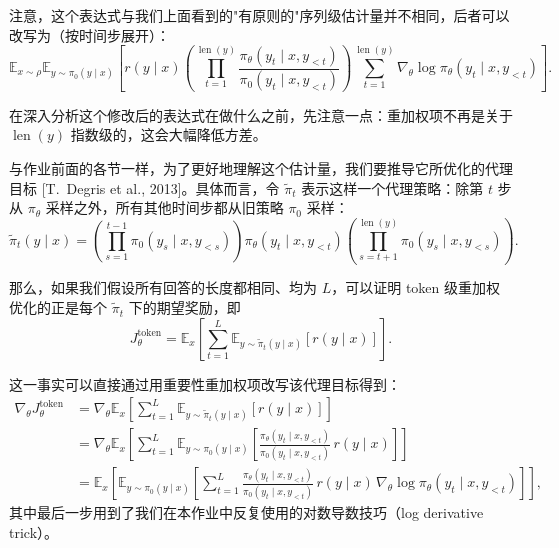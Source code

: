 注意，这个表达式与我们上面看到的"有原则的"序列级估计量并不相同，后者可以改写为（按时间步展开）：
\begin{equation}
\mathbb{E}_{x\sim\rho}\mathbb{E}_{y\sim\pi_0(y \mid x)}\!\left[r(y \mid x)\left(\prod_{t=1}^{\operatorname{len}(y)} \frac{\pi_\theta(y_t \mid x, y_{<t})}{\pi_0(y_t \mid x, y_{<t})}\right)\sum_{t=1}^{\operatorname{len}(y)} \nabla_\theta \log \pi_\theta(y_t \mid x, y_{<t})\right].
\end{equation}

在深入分析这个修改后的表达式在做什么之前，先注意一点：重加权项不再是关于 $\operatorname{len}(y)$ 指数级的，这会大幅降低方差。

与作业前面的各节一样，为了更好地理解这个估计量，我们要推导它所优化的代理目标 [T.\ Degris et al., 2013]。具体而言，令 $\tilde{\pi}_t$ 表示这样一个代理策略：除第 $t$ 步从 $\pi_\theta$ 采样之外，所有其他时间步都从旧策略 $\pi_0$ 采样：
\begin{equation}
\tilde{\pi}_t(y \mid x) = \left(\prod_{s=1}^{t-1} \pi_0(y_s \mid x, y_{<s})\right)\pi_\theta(y_t \mid x, y_{<t})\left(\prod_{s=t+1}^{\operatorname{len}(y)} \pi_0(y_s \mid x, y_{<s})\right).
\end{equation}

那么，如果我们假设所有回答的长度都相同、均为 $L$，可以证明 token 级重加权优化的正是每个 $\tilde{\pi}_t$ 下的期望奖励，即
\begin{equation}
J_\theta^{\text{token}} = \mathbb{E}_{x}\!\left[\sum_{t=1}^{L}\mathbb{E}_{y\sim\tilde{\pi}_t(y \mid x)}\!\left[r(y \mid x)\right]\right].
\end{equation}

这一事实可以直接通过用重要性重加权项改写该代理目标得到：
\begin{align}
\nabla_\theta J_\theta^{\text{token}} &= \nabla_\theta \mathbb{E}_{x}\!\left[\sum_{t=1}^{L}\mathbb{E}_{y\sim\tilde{\pi}_t(y \mid x)}\!\left[r(y \mid x)\right]\right] \nonumber\\
&= \nabla_\theta \mathbb{E}_{x}\!\left[\sum_{t=1}^{L}\mathbb{E}_{y\sim\pi_0(y \mid x)}\!\left[\frac{\pi_\theta(y_t \mid x, y_{<t})}{\pi_0(y_t \mid x, y_{<t})}\, r(y \mid x)\right]\right] \nonumber\\
&= \mathbb{E}_{x}\!\left[\mathbb{E}_{y\sim\pi_0(y \mid x)}\!\left[\sum_{t=1}^{L}\frac{\pi_\theta(y_t \mid x, y_{<t})}{\pi_0(y_t \mid x, y_{<t})}\, r(y \mid x)\,\nabla_\theta \log \pi_\theta(y_t \mid x, y_{<t})\right]\right],
\end{align}
其中最后一步用到了我们在本作业中反复使用的对数导数技巧（log derivative trick）。

